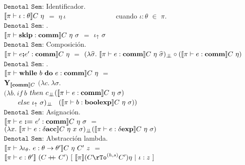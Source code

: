 \noindent
$\texttt{Denotal Sem:}$ Identificador.\\

$\semBrcks{ \pi \vdash \iota : \theta }C \ \eta$ $=$ $\eta \ \iota$
\ \ \ \ \ \ \ \ \ \ \ \ \ \ cuando $\iota:\theta$ $\in$ $\pi$.\\

\noindent
$\texttt{Denotal Sem:}$ \cskip.\\

$\semBrcks{ \pi \vdash \cskip : \commt }C \ \eta \ \sigma$ $=$ $\iota_{\uparrow} \ \sigma$\\

\noindent
$\texttt{Denotal Sem:}$ Composici\'on.\\

$\llbracket  \pi \vdash e \textbf{;} e' : \textbf{comm}  \rrbracket C \ \eta$ 
$=$ 
$(\lambda \widehat{\sigma} . \ \llbracket \pi \vdash e : \textbf{comm} \rrbracket C \ \eta \ \widehat{\sigma})_{\bot \!\!\! \bot}
\circ
(\llbracket  \pi \vdash e : \textbf{comm} \rrbracket C \ \eta)$\\

\noindent
$\texttt{Denotal Sem:}$ \cwhile.\\

$\llbracket  \pi \vdash \textbf{while} \ b \ \textbf{do} \ e : \textbf{comm}  \rrbracket C \ \eta$ 
$=$ \\
\indent \indent \indent
$\textbf{Y}_{\llbracket \textbf{comm} \rrbracket C}$ $(\lambda c . \ \lambda \sigma . \ $\\
\indent \indent \indent \indent \indent \indent
$(\lambda b . \ if \ b $ $then \ c_{\bot \!\!\! \bot} (\llbracket \pi \vdash e : \textbf{comm} \rrbracket C \ \eta \ \sigma)$\\
 \indent \indent  \indent \indent \indent \indent \indent \indent \ \ \ \
$else \ \iota_{\uparrow} \ \sigma)_{\bot \!\!\! \bot}$ \
$(\llbracket  \pi \vdash b : \textbf{boolexp} \rrbracket C \ \eta \ \sigma))$\\

\noindent
$\texttt{Denotal Sem:}$ Asignaci\'on.\\

$\llbracket  \pi \vdash e \ \textbf{:=} \ e' : \textbf{comm}  \rrbracket C \ \eta \ \sigma$ 
$=$ \\
\indent \indent \indent \indent \indent 
$(\lambda x . \ \llbracket \pi \vdash e : \delta \textbf{acc} \rrbracket C \ \eta \ x \ \sigma)_{\bot \!\!\! \bot}
(\llbracket  \pi \vdash e : \delta \textbf{exp}  \rrbracket C \ \eta \ \sigma)$\\

\noindent
$\texttt{Denotal Sem:}$ Abstracci\'on lambda.\\

$\llbracket  \pi \vdash \lambda \iota_{\theta} . \ e : \theta \rightarrow \theta'  \rrbracket C \ \eta \ C' \ z$ 
$=$ \\
\indent \indent \indent \indent \indent 
$\semBrcks{ \pi \vdash e : \theta' } \ (C \concat C') \
[ \ \semBrcks{\pi}(C \rTo^{(h,s)} C')\eta \ | \ \iota:z \ ]$\\

